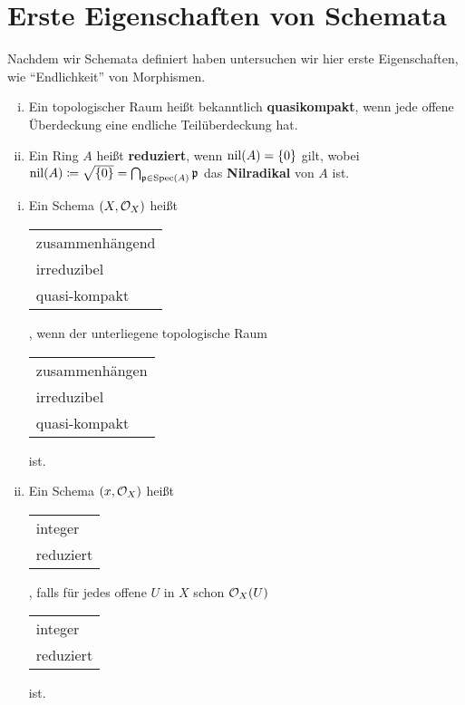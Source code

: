 
\chapter{Erste Eigenschaften von Schemata}
\label{chapter:6}

Nachdem wir Schemata definiert haben untersuchen wir hier erste Eigenschaften, wie \enquote{Endlichkeit} von Morphismen.

\begin{eri}
\label{eri:6.1}
	\begin{enumerate}[i)]
		\item Ein topologischer Raum heißt bekanntlich \textbf{quasikompakt}, wenn jede offene Überdeckung eine endliche Teilüberdeckung hat.
		\item Ein Ring $A$ heißt \textbf{reduziert}, wenn $\operatorname{nil}(A) = \{0\}$ gilt, wobei $\operatorname{nil}(A) \coloneqq \sqrt{\{0\}} = \bigcap_{\mathfrak{p} \in \operatorname{Spec}(A)} \mathfrak{p}$ das \textbf{Nilradikal} von $A$ ist.
	\end{enumerate}
\end{eri}

\begin{defn}
\label{defn:6.2}
	\begin{enumerate}[i)]
		\item Ein Schema $(X,\mathcal{O}_X)$ heißt
		\begin{tabular}{l}
			zusammenhängend\\
			irreduzibel\\
			quasi-kompakt
		\end{tabular},
		wenn der unterliegene topologische Raum
		\begin{tabular}{l}
			zusammenhängen\\
			irreduzibel\\
			quasi-kompakt
		\end{tabular} ist.
		\item Ein Schema $(x, \mathcal{O}_X)$ heißt
		\begin{tabular}{l}
			integer\\
			reduziert
		\end{tabular},
		falls für jedes offene $U$ in $X$ schon $\mathcal{O}_X(U)$
		\begin{tabular}{l}
			integer\\
			reduziert
		\end{tabular} ist.
	\end{enumerate}
\end{defn}

